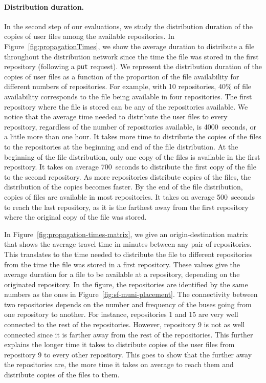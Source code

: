 \paragraph{Distribution duration.} 
In the second step of our evaluations, we study the distribution duration of the copies of user files among the available repositories. In Figure~\ref{fig:propagationTimes}, we show the average duration to distribute a file throughout the distribution network since the time the file was stored in the first repository (following a \texttt{put} request). We represent the distribution duration of the copies of user files as a function of the proportion of the file availability for different numbers of repositories. For example, with 10 repositories, 40\% of file availability corresponds to the file being available in four repositories. The first repository where the file is stored can be any of the repositories available. We notice that the average time needed to distribute the user files to every repository, regardless of the number of repositories available, is 4000~seconds, or a little more than one hour. It takes more time to distribute the copies of the files to the repositories at the beginning and end of the file distribution. At the beginning of the file distribution, only one copy of the files is available in the first repository. It takes on average 700~seconds to distribute the first copy of the file to the second repository. As more repositories distribute copies of the files, the distribution of the copies becomes faster. By the end of the file distribution, copies of files are available in most repositories. It takes on average 500~seconds to reach the last repository, as it is the farthest away from the first repository where the original copy of the file was stored.

In Figure~\ref{fig:propagation-times-matrix}, we give an origin-destination matrix that shows the average travel time in minutes between any pair of repositories. This translates to the time needed to distribute the file to different repositories from the time the file was stored in a first repository. These values give the average duration for a file to be available at a repository, depending on the originated repository. In the figure, the repositories are identified by the same numbers as the ones in Figure~\ref{fig:sf-muni-placement}. The connectivity between two repositories depends on the number and frequency of the buses going from one repository to another. For instance, repositories 1 and 15 are very well connected to the rest of the repositories. However, repository 9 is not as well connected since it is farther away from the rest of the repositories. This further explains the longer time it takes to distribute copies of the user files from repository 9 to every other repository. This goes to show that the further away the repositories are, the more time it takes on average to reach them and distribute copies of the files to them. 

